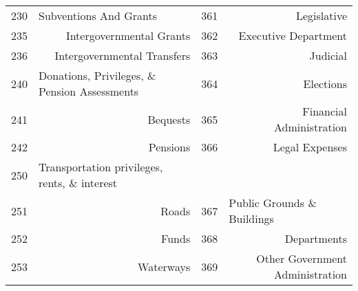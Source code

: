 \begin{tabular}{@{}rr|r|r|@{}}
\multicolumn{1}{|l|}{230}           & \multicolumn{1}{l|}{Subventions And Grants}                        & 361                                & Legislative                                                                        \\
\multicolumn{1}{|r|}{235}           & Intergovernmental Grants                                           & 362                                & Executive Department                                                               \\
\multicolumn{1}{|r|}{236}           & Intergovernmental Transfers                                        & 363                                & Judicial                                                                           \\
\multicolumn{1}{|l|}{240}           & \multicolumn{1}{l|}{Donations, Privileges, \& Pension Assessments} & 364                                & Elections                                                                          \\
\multicolumn{1}{|r|}{241}           & Bequests                                                           & 365                                & Financial Administration                                                           \\
\multicolumn{1}{|r|}{242}           & Pensions                                                           & 366                                & Legal Expenses                                                                     \\
\multicolumn{1}{|l|}{250}           & \multicolumn{1}{l|}{Transportation privileges, rents, \& interest} & \multicolumn{1}{l|}{}              & \multicolumn{1}{l|}{}                                                              \\
\multicolumn{1}{|r|}{251}           & Roads                                                              & \multicolumn{1}{l|}{367}           & \multicolumn{1}{l|}{Public Grounds \& Buildings}                                   \\
\multicolumn{1}{|r|}{252}           & Funds                                                              & 368                                & Departments                                                                        \\
\multicolumn{1}{|r|}{253}           & Waterways                                                          & 369                                & Other Government Administration                                                    \\

\end{tabular}
